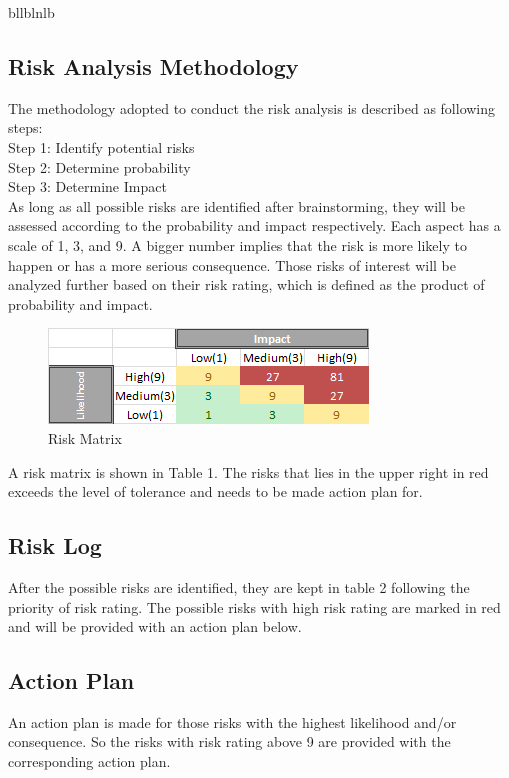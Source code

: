 

bllblnlb
\subsection{Risk Analysis Methodology}
The methodology adopted to conduct the risk analysis is described as following steps: \\Step 1: Identify potential risks \\Step 2: Determine probability \\Step 3: Determine Impact\\  As long as all possible risks are identified after brainstorming, they will be assessed according to the probability and impact respectively. Each aspect has a scale of 1, 3, and 9. A bigger number implies that the risk is more likely to happen or has a more serious consequence. Those risks of interest will be analyzed further based on their risk rating, which is defined as the product of probability and impact. 
\begin{figure}[h!]
\centering
\includegraphics[scale=1.0]{Pictures/riskmatrix.png}
\caption{Risk Matrix}
\label{fig:riskmatrix}
\end{figure}

A risk matrix is shown in Table 1. The risks that lies in the upper right in red exceeds the level of tolerance and needs to be made action plan for. 
\subsection{Risk Log}
After the possible risks are identified, they are kept in table 2 following the priority of risk rating. The possible risks with high risk rating are marked in red and will be provided with an action plan below. 

\subsection{Action Plan}

An action plan is made for those risks with the highest likelihood and/or consequence. So the risks with risk rating above 9 are provided with the corresponding action plan.



